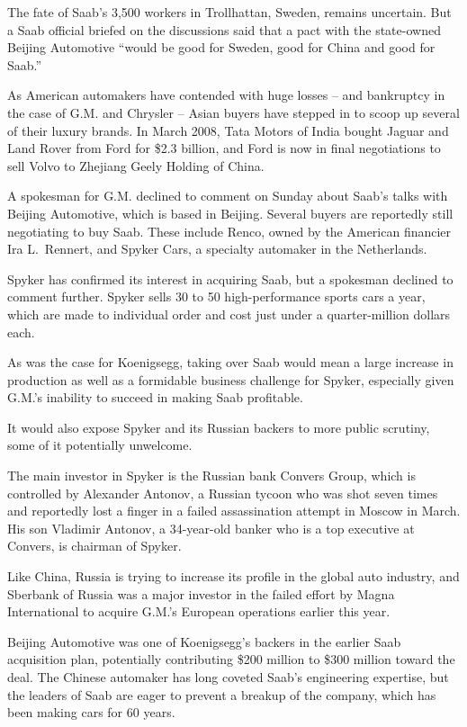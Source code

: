 ﻿\documentclass[12pt]{article}
\begin{document}
The fate of Saab's 3,500 workers in Trollhattan, Sweden, remains uncertain. But a Saab official
briefed on the discussions said that a pact with the state-owned Beijing Automotive ``would be good
for Sweden, good for China and good for Saab.''

As American automakers have contended with huge losses -- and bankruptcy in the case of G.M. and
Chrysler -- Asian buyers have stepped in to scoop up several of their luxury brands. In March 2008,
Tata Motors of India bought Jaguar and Land Rover from Ford for \$2.3 billion, and Ford is now in
final negotiations to sell Volvo to Zhejiang Geely Holding of China.

A spokesman for G.M. declined to comment on Sunday about Saab's talks with Beijing Automotive, which
is based in Beijing. Several buyers are reportedly still negotiating to buy Saab. These include
Renco, owned by the American financier Ira L.~Rennert, and Spyker Cars, a specialty automaker in the
Netherlands.

Spyker has confirmed its interest in acquiring Saab, but a spokesman declined to comment further.
Spyker sells 30 to 50 high-performance sports cars a year, which are made to individual order and
cost just under a quarter-million dollars each.

As was the case for Koenigsegg, taking over Saab would mean a large increase in production as well
as a formidable business challenge for Spyker, especially given G.M.'s inability to succeed in
making Saab profitable.

It would also expose Spyker and its Russian backers to more public scrutiny, some of it potentially
unwelcome.

The main investor in Spyker is the Russian bank Convers Group, which is controlled by Alexander
Antonov, a Russian tycoon who was shot seven times and reportedly lost a finger in a failed
assassination attempt in Moscow in March. His son Vladimir Antonov, a 34-year-old banker who is a
top executive at Convers, is chairman of Spyker.

Like China, Russia is trying to increase its profile in the global auto industry, and Sberbank of
Russia was a major investor in the failed effort by Magna International to acquire G.M.'s European
operations earlier this year.

Beijing Automotive was one of Koenigsegg's backers in the earlier Saab acquisition plan, potentially
contributing \$200 million to \$300 million toward the deal. The Chinese automaker has long coveted
Saab's engineering expertise, but the leaders of Saab are eager to prevent a breakup of the company,
which has been making cars for 60 years.
\end{document}
